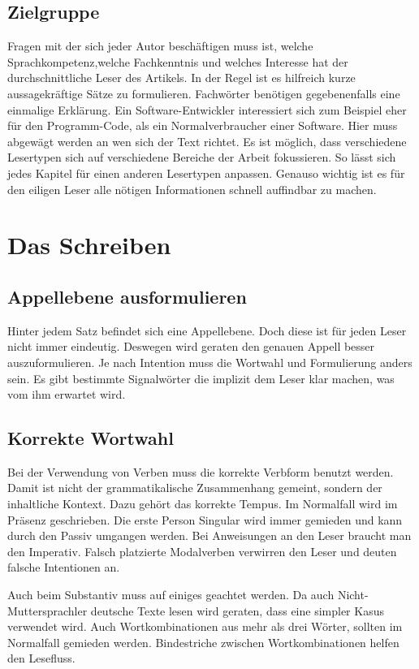\documentclass{article}
\begin{document}
\subsection{Zielgruppe}
Fragen mit der sich jeder Autor beschäftigen muss ist, welche Sprachkompetenz,welche Fachkenntnis und welches Interesse hat der durchschnittliche Leser des Artikels. In der Regel ist es hilfreich kurze aussagekräftige Sätze zu formulieren. Fachwörter benötigen gegebenenfalls eine einmalige Erklärung. Ein Software-Entwickler interessiert sich zum Beispiel eher für den Programm-Code, als ein Normalverbraucher einer Software. Hier muss abgewägt werden an wen sich der Text richtet. Es ist möglich, dass verschiedene Lesertypen sich auf verschiedene Bereiche der Arbeit fokussieren. So lässt sich jedes Kapitel für einen anderen Lesertypen anpassen.
Genauso wichtig ist es für den \glqq eiligen Leser\grqq{} alle nötigen Informationen schnell auffindbar zu machen.
\section{Das Schreiben}
\subsection{Appellebene ausformulieren}
Hinter jedem Satz befindet sich eine Appellebene. Doch diese ist für jeden Leser nicht immer eindeutig. Deswegen wird geraten den genauen Appell besser auszuformulieren. Je nach Intention muss die Wortwahl und Formulierung anders sein. Es gibt bestimmte Signalwörter die implizit dem Leser klar machen, was vom ihm erwartet wird.

\subsection{Korrekte Wortwahl}
Bei der Verwendung von Verben muss die korrekte Verbform benutzt werden.
Damit ist nicht der grammatikalische Zusammenhang gemeint, sondern der inhaltliche Kontext.
Dazu gehört das korrekte Tempus. Im Normalfall wird im Präsenz geschrieben. 
Die erste Person Singular wird immer gemieden und kann durch den Passiv umgangen werden. Bei Anweisungen an den Leser braucht man den Imperativ. Falsch platzierte Modalverben verwirren den Leser und deuten falsche Intentionen an.

Auch beim Substantiv muss auf einiges geachtet werden. Da auch Nicht-Muttersprachler deutsche Texte lesen wird geraten, dass eine simpler Kasus verwendet wird. Auch Wortkombinationen aus mehr als drei Wörter, sollten im Normalfall gemieden werden. Bindestriche zwischen Wortkombinationen helfen den Lesefluss.
\end{document}
